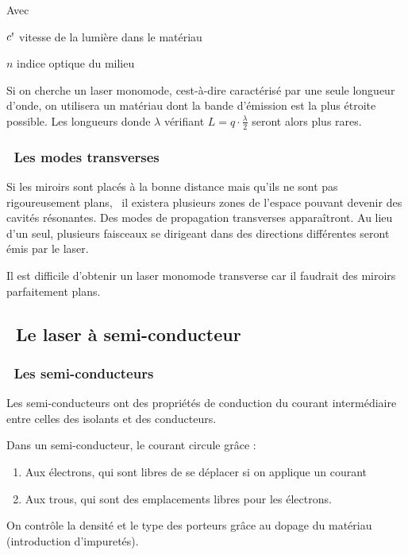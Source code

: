 \documentclass[12pt,twoside]{article}
\newcommand\liststyleLvii{%
\renewcommand\labelitemi{[25CF?]}
\renewcommand\labelitemii{[25CB?]}
\renewcommand\labelitemiii{[25A0?]}
\renewcommand\labelitemiv{[25CF?]}
}
\begin{document}
Avec

 $c\text{{\textquotesingle}}$ vitesse de la lumi\`ere dans le mat\'eriau

 $n$ indice optique du milieu


\bigskip

Si on cherche un laser monomode, c{\textquotesingle}est{}-\`a{}-dire
caract\'eris\'e par une seule longueur d'onde, on utilisera un
mat\'eriau dont la bande d'\'emission est la plus \'etroite possible.
Les longueurs d{\textquotesingle}onde $\lambda $ v\'erifiant $L=q\cdot
{\frac{\lambda }{2}}$ seront alors plus rares.

\subsubsection[\ Les modes transverses]{\ Les modes transverses}
Si les miroirs sont plac\'es \`a la bonne distance mais qu'ils ne sont
pas rigoureusement plans, \ il existera plusieurs zones de l'espace
pouvant devenir des cavit\'es r\'esonantes. Des modes de propagation
transverses appara\^itront. Au lieu d'un seul, plusieurs faisceaux se
dirigeant dans des directions diff\'erentes seront \'emis par le laser.

Il est difficile d'obtenir un laser monomode transverse car il faudrait
des miroirs parfaitement plans.

\subsection[\ Le laser \`a semi{}-conducteur]{\ Le laser \`a
\foreignlanguage{english}{semi}{}-conducteur}
\subsubsection[\ Les semi{}-conducteurs]{\ Les
\foreignlanguage{english}{semi}{}-conducteurs}
Les \foreignlanguage{english}{semi}{}-conducteurs ont des propri\'et\'es
de conduction du courant interm\'ediaire entre celles des isolants et
des conducteurs.

Dans un \foreignlanguage{english}{semi}{}-conducteur, le courant circule
gr\^ace :

\liststyleLvii
\begin{enumerate}
\item Aux \'electrons, qui sont libres de se d\'eplacer si on applique
un courant
\item Aux trous, qui sont des emplacements libres pour les \'electrons.
\end{enumerate}
On contr\^ole la densit\'e et le type des porteurs gr\^ace au dopage du
mat\'eriau (introduction d'impuret\'es).
\end{document}
